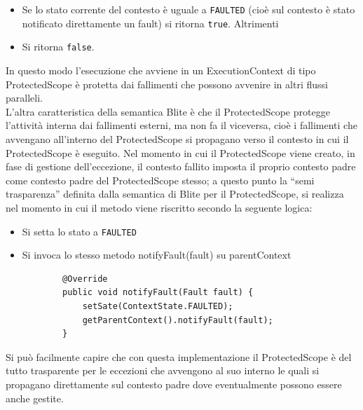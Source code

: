 \begin{itemize}
  \item Se lo stato corrente del contesto \`e uguale a \texttt{FAULTED} (cioè
  sul contesto \`e stato notificato direttamente un fault) si ritorna
  \texttt{true}. Altrimenti 
  \item Si ritorna \texttt{false}.
\end{itemize}

In questo modo l'esecuzione che avviene in un ExecutionContext di tipo
ProtectedScope \`e protetta dai fallimenti che possono avvenire in altri flussi
paralleli. 
\\

L'altra caratteristica della semantica Blite \`e che il ProtectedScope protegge
l'attività interna dai fallimenti esterni, ma non fa il viceversa, cioè i
fallimenti che avvengano all'interno del ProtectedScope si propagano verso il
contesto in cui il ProtectedScope \`e eseguito. Nel momento in cui il
ProtectedScope viene creato, in fase di gestione dell'eccezione, il contesto
fallito imposta il proprio contesto padre come contesto padre del ProtectedScope
stesso; a questo punto la ``semi trasparenza'' definita dalla semantica di Blite
per il ProtectedScope, si realizza nel momento in cui il metodo
 viene riscritto secondo la seguente logica:

\begin{itemize}
  \item Si setta lo stato a \texttt{FAULTED}
  \item Si invoca lo stesso metodo notifyFault(fault) su parentContext
	\lstset{frame=NONE}
	\begin{lstlisting}
		@Override
   		public void notifyFault(Fault fault) {
        	setSate(ContextState.FAULTED);
        	getParentContext().notifyFault(fault);
    	}
  	\end{lstlisting}   
\end{itemize}

Si può facilmente capire che con questa implementazione il ProtectedScope è del
tutto trasparente per le eccezioni che avvengono al suo interno le quali si
propagano direttamente sul contesto padre dove eventualmente possono essere
anche gestite.
